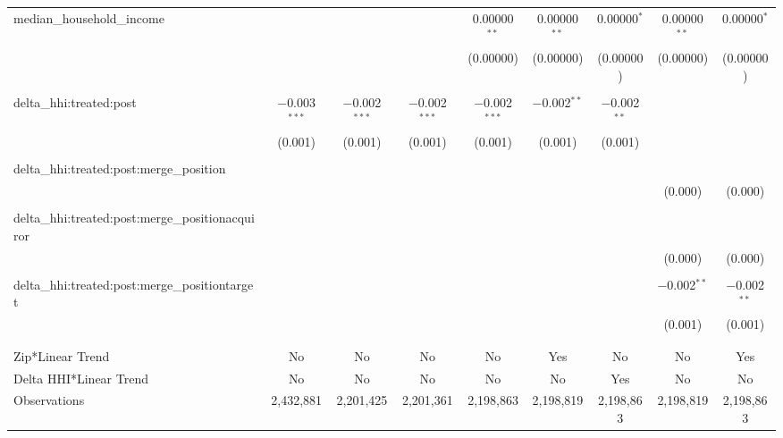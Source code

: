 \begin{table}[H]
{\begin{tabular}{@{\extracolsep{5pt}}lcccccccc}
  median\_household\_income &  &  &  & 0.00000$^{**}$ & 0.00000$^{**}$ & 0.00000$^{*}$ & 0.00000$^{**}$ & 0.00000$^{*}$ \\  

   &  &  &  & (0.00000) & (0.00000) & (0.00000) & (0.00000) & (0.00000) \\  

   & & & & & & & & \\  

  delta\_hhi:treated:post & $-$0.003$^{***}$ & $-$0.002$^{***}$ & $-$0.002$^{***}$ & $-$0.002$^{***}$ & $-$0.002$^{**}$ & $-$0.002$^{**}$ &  &  \\  

   & (0.001) & (0.001) & (0.001) & (0.001) & (0.001) & (0.001) &  &  \\  

   & & & & & & & & \\  

  delta\_hhi:treated:post:merge\_position &  &  &  &  &  &  &  &  \\  

   &  &  &  &  &  &  & (0.000) & (0.000) \\  

   & & & & & & & & \\  

  delta\_hhi:treated:post:merge\_positionacquiror &  &  &  &  &  &  &  &  \\  

   &  &  &  &  &  &  & (0.000) & (0.000) \\  

   & & & & & & & & \\  

  delta\_hhi:treated:post:merge\_positiontarget &  &  &  &  &  &  & $-$0.002$^{**}$ & $-$0.002$^{**}$ \\  

   &  &  &  &  &  &  & (0.001) & (0.001) \\  

   & & & & & & & & \\  

 \hline \\[-1.8ex]  

 Zip*Linear Trend & No & No & No & No & Yes & No & No & Yes \\  

 Delta HHI*Linear Trend & No & No & No & No & No & Yes & No & No \\  

 Observations & 2,432,881 & 2,201,425 & 2,201,361 & 2,198,863 & 2,198,819 & 2,198,863 & 2,198,819 & 2,198,863 \\  


\end{tabular}}
\end{table}
